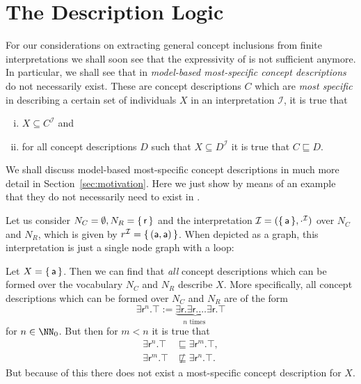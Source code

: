 \section{The Description Logic \ELgfpbot}
\label{sec:descr-logics-elbot}

For our considerations on extracting general concept inclusions from finite
interpretations we shall soon see that the expressivity of \ELbot is not sufficient
anymore.  In particular, we shall see that in \ELbot \emph{model-based most-specific
  concept descriptions} do not necessarily exist.  These are concept descriptions $C$
which are \emph{most specific} in describing a certain set of individuals $X$ in an
interpretation $\mathcal{I}$, \ie it is true that
\begin{enumerate}[i. ]
\item $X \subseteq C^{\mathcal{I}}$ and
\item for all concept descriptions $D$ such that $X \subseteq D^{\mathcal{I}}$ it is true
  that $C \sqsubseteq D$.
\end{enumerate}
We shall discuss model-based most-specific concept descriptions in much more detail in
Section~\ref{sec:motivation}.  Here we just show by means of an example that they do not
necessarily need to exist in \ELbot.

\begin{Example}
  \label{expl:mmscs-may-not-exist-in-ELbot}
  Let us consider $N_C = \emptyset, N_R = {\{\, \mathsf{r} \,\}}$ and the interpretation
  $\mathcal{I} = ({\{\,\mathsf{a}\,\}}, \cdot^{\mathcal{I}})$ over $N_C$ and $N_R$, which is
  given by $r^{\mathcal{I}} = {\{\, (\mathsf{a}, \mathsf{a}) \,\}}$.  When depicted as a
  graph, this interpretation is just a single node graph with a loop:
  \begin{center}
  \end{center}
  Let $X = {\{\, \mathsf{a} \,\}}$.  Then we can find that \emph{all} \EL concept descriptions
  which can be formed over the vocabulary $N_C$ and $N_R$ describe $X$.  More
  specifically, all \EL concept descriptions which can be formed over $N_C$ and $N_R$ are
  of the form
  \begin{equation*}
    \exists \mathsf{r}^n. \top := \underbrace{\exists \mathsf{r}. \exists \mathsf{r}. \dots \exists
      \mathsf{r}}_{n \text{ times }}. \top
  \end{equation*}
  for $n \in \NN_0$.  But then for $m < n$ it is true that
  \begin{align*}
    \exists \mathsf{r}^{n}. \top &\sqsubseteq \exists \mathsf{r}^m. \top, \\
    \exists \mathsf{r}^{m}. \top &\not\sqsubseteq \exists \mathsf{r}^n. \top.
  \end{align*}
  But because of this there does not exist a most-specific concept description for $X$.
\end{Example}

